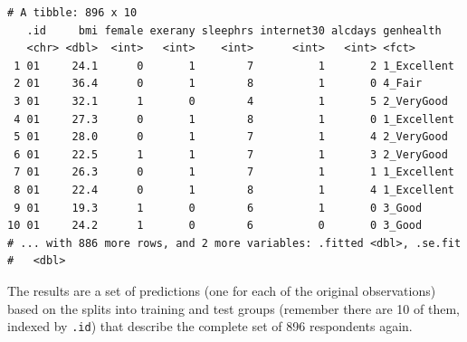 \documentclass[]{book}
\newenvironment{Shaded}{\begin{snugshade}}{\end{snugshade}}
\newcommand{\KeywordTok}[1]{\textcolor[rgb]{0.13,0.29,0.53}{\textbf{#1}}}
\newcommand{\DataTypeTok}[1]{\textcolor[rgb]{0.13,0.29,0.53}{#1}}
\newcommand{\DecValTok}[1]{\textcolor[rgb]{0.00,0.00,0.81}{#1}}
\newcommand{\StringTok}[1]{\textcolor[rgb]{0.31,0.60,0.02}{#1}}
\newcommand{\OperatorTok}[1]{\textcolor[rgb]{0.81,0.36,0.00}{\textbf{#1}}}
\newcommand{\NormalTok}[1]{#1}
\theoremstyle{definition}
\theoremstyle{definition}
\theoremstyle{definition}
\theoremstyle{remark}
\begin{document}
\begin{Shaded}
\end{Shaded}

\begin{verbatim}
# A tibble: 896 x 10
   .id     bmi female exerany sleephrs internet30 alcdays genhealth  
   <chr> <dbl>  <int>   <int>    <int>      <int>   <int> <fct>      
 1 01     24.1      0       1        7          1       2 1_Excellent
 2 01     36.4      0       1        8          1       0 4_Fair     
 3 01     32.1      1       0        4          1       5 2_VeryGood 
 4 01     27.3      0       1        8          1       0 1_Excellent
 5 01     28.0      0       1        7          1       4 2_VeryGood 
 6 01     22.5      1       1        7          1       3 2_VeryGood 
 7 01     26.3      0       1        7          1       1 1_Excellent
 8 01     22.4      0       1        8          1       4 1_Excellent
 9 01     19.3      1       0        6          1       0 3_Good     
10 01     24.2      1       0        6          0       0 3_Good     
# ... with 886 more rows, and 2 more variables: .fitted <dbl>, .se.fit
#   <dbl>
\end{verbatim}

The results are a set of predictions (one for each of the original
observations) based on the splits into training and test groups
(remember there are 10 of them, indexed by \texttt{.id}) that describe
the complete set of 896 respondents again.
\end{document}
